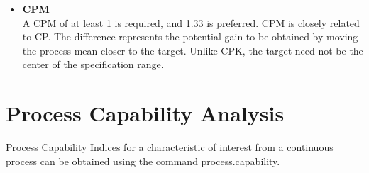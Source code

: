 \documentclass[]{report}
\begin{document}
{\begin{itemize}
\item\textbf{ CPM}\\
A CPM of at least 1 is required, and 1.33 is preferred. CPM is closely related to CP. The difference represents the potential gain to be obtained by moving the process mean closer to the target. Unlike CPK, the target need not be the center of the specification range.
\end{itemize}
\newpage
}
\newpage

\section{Process Capability Analysis}


Process Capability Indices for a characteristic of interest from a continuous process can be
obtained using the command process.capability.
\end{document}
